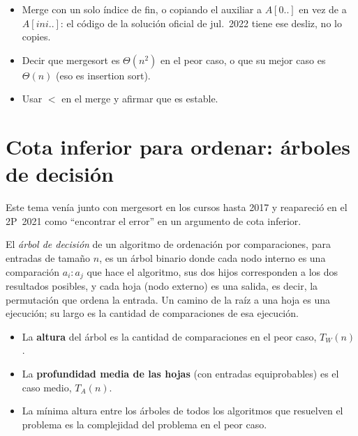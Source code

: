 \begin{trampa}
\begin{itemize}
  \item Merge con un solo índice de fin, o copiando el auxiliar a $A[0..]$ en vez de a $A[ini..]$: el código de la solución oficial de jul.~2022 tiene ese desliz, no lo copies.
  \item Decir que mergesort es $\Theta(n^2)$ en el peor caso, o que su mejor caso es $\Theta(n)$ (eso es insertion sort).
  \item Usar $<$ en el merge y afirmar que es estable.
\end{itemize}
\end{trampa}

\section{Cota inferior para ordenar: árboles de decisión}

Este tema venía junto con mergesort en los cursos hasta 2017 y reapareció en el 2P~2021 como ``encontrar el error'' en un argumento de cota inferior.

\begin{definicion}
El \emph{árbol de decisión} de un algoritmo de ordenación por comparaciones, para entradas de tamaño $n$, es un árbol binario donde cada nodo interno es una comparación $a_i:a_j$ que hace el algoritmo, sus dos hijos corresponden a los dos resultados posibles, y cada hoja (nodo externo) es una salida, es decir, la permutación que ordena la entrada. Un camino de la raíz a una hoja es una ejecución; su largo es la cantidad de comparaciones de esa ejecución.
\end{definicion}

\begin{itemize}
  \item La \textbf{altura} del árbol es la cantidad de comparaciones en el peor caso, $T_W(n)$.
  \item La \textbf{profundidad media de las hojas} (con entradas equiprobables) es el caso medio, $T_A(n)$.
  \item La mínima altura entre los árboles de todos los algoritmos que resuelven el problema es la complejidad del problema en el peor caso.
\end{itemize}


